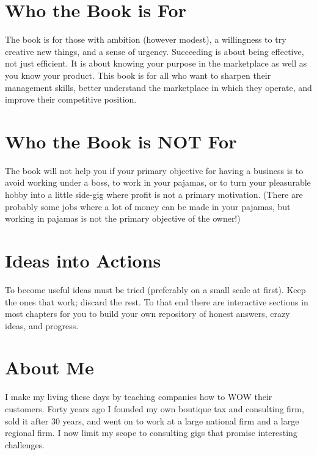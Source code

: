 \documentclass[
]{book}
\begin{document}
\hypertarget{who-the-book-is-for}{%
\section{Who the Book is For}\label{who-the-book-is-for}}

The book is for those with ambition (however modest), a willingness to try creative new things, and a sense of urgency. Succeeding is about being effective, not just efficient. It is about knowing your purpose in the marketplace as well as you know your product. This book is for all who want to sharpen their management skills, better understand the marketplace in which they operate, and improve their competitive position.

\hypertarget{who-the-book-is-not-for}{%
\section{Who the Book is NOT For}\label{who-the-book-is-not-for}}

The book will not help you if your primary objective for having a business is to avoid working under a boss, to work in your pajamas, or to turn your pleasurable hobby into a little side-gig where profit is not a primary motivation. (There are probably some jobs where a lot of money can be made in your pajamas, but working in pajamas is not the primary objective of the owner!)

\hypertarget{ideas-into-actions}{%
\section{Ideas into Actions}\label{ideas-into-actions}}

To become useful ideas must be tried (preferably on a small scale at first). Keep the ones that work; discard the rest. To that end there are interactive sections in most chapters for you to build your own repository of honest answers, crazy ideas, and progress.

\hypertarget{about-me}{%
\section{About Me}\label{about-me}}

I make my living these days by teaching companies how to WOW their customers. Forty years ago I founded my own boutique tax and consulting firm, sold it after 30 years, and went on to work at a large national firm and a large regional firm. I now limit my scope to consulting gigs that promise interesting challenges.
\end{document}
